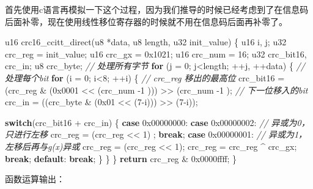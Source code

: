 \documentclass[
]{article}
\newenvironment{Shaded}{}{}
\newcommand{\BaseNTok}[1]{\textcolor[rgb]{0.25,0.63,0.44}{#1}}
\newcommand{\CommentTok}[1]{\textcolor[rgb]{0.38,0.63,0.69}{\textit{#1}}}
\newcommand{\ControlFlowTok}[1]{\textcolor[rgb]{0.00,0.44,0.13}{\textbf{#1}}}
\newcommand{\DecValTok}[1]{\textcolor[rgb]{0.25,0.63,0.44}{#1}}
\newcommand{\NormalTok}[1]{#1}
\begin{document}
首先使用c语言再模拟一下这个过程，因为我们推导的时候已经考虑到了在信息码后面补零，现在使用线性移位寄存器的时候就不用在信息码后面再补零了。

\begin{Shaded}
\begin{Highlighting}[]
\NormalTok{u16 crc16\_ccitt\_direct(u8 *data, u8 length, u32 init\_value)}
\NormalTok{\{}
\NormalTok{	u16 i, j;}
\NormalTok{	u32 crc\_reg = init\_value;}
\NormalTok{	u16 crc\_gx = }\BaseNTok{0x1021}\NormalTok{;}
\NormalTok{	u16 crc\_num = }\DecValTok{16}\NormalTok{;}
\NormalTok{	u32 crc\_bit16, crc\_in;}
\NormalTok{	u8 crc\_byte;}
    \CommentTok{// 处理所有字节}
	\ControlFlowTok{for}\NormalTok{ (j = }\DecValTok{0}\NormalTok{; j\textless{}length; ++j, ++data)}
\NormalTok{	\{}
        \CommentTok{// 处理每个bit}
		\ControlFlowTok{for}\NormalTok{ (i = }\DecValTok{0}\NormalTok{; i\textless{}}\DecValTok{8}\NormalTok{; ++i)}
\NormalTok{		\{}
            \CommentTok{// crc\_reg 移出的最高位}
\NormalTok{			crc\_bit16 = (crc\_reg \& (}\BaseNTok{0x0001}\NormalTok{ \textless{}\textless{} (crc\_num {-}}\DecValTok{1}\NormalTok{ ))) \textgreater{}\textgreater{} (crc\_num {-}}\DecValTok{1}\NormalTok{ );}
			\CommentTok{// 下一位移入的bit}
\NormalTok{            crc\_in = ((crc\_byte \& (}\BaseNTok{0x01}\NormalTok{ \textless{}\textless{} (}\DecValTok{7}\NormalTok{{-}i))) \textgreater{}\textgreater{} (}\DecValTok{7}\NormalTok{{-}i));}

			\ControlFlowTok{switch}\NormalTok{(crc\_bit16 + crc\_in)}
\NormalTok{			\{}
				\ControlFlowTok{case} \BaseNTok{0x00000000}\NormalTok{:}
				\ControlFlowTok{case} \BaseNTok{0x00000002}\NormalTok{:}
                    \CommentTok{// 异或为0，只进行左移}
\NormalTok{					crc\_reg = (crc\_reg \textless{}\textless{} }\DecValTok{1}\NormalTok{) ;}
					\ControlFlowTok{break}\NormalTok{;}
				\ControlFlowTok{case} \BaseNTok{0x00000001}\NormalTok{:}
                    \CommentTok{// 异或为1，左移后再与g(x)异或}
\NormalTok{					crc\_reg = (crc\_reg \textless{}\textless{} }\DecValTok{1}\NormalTok{);}
\NormalTok{					crc\_reg = crc\_reg \^{} crc\_gx;}
					\ControlFlowTok{break}\NormalTok{;}
				\ControlFlowTok{default}\NormalTok{:}
					\ControlFlowTok{break}\NormalTok{;}
\NormalTok{			\}}
\NormalTok{		\}}
\NormalTok{	\}}
	\ControlFlowTok{return}\NormalTok{ crc\_reg \& }\BaseNTok{0x0000ffff}\NormalTok{;}
\NormalTok{\}}
\end{Highlighting}
\end{Shaded}

函数运算输出：
\end{document}
